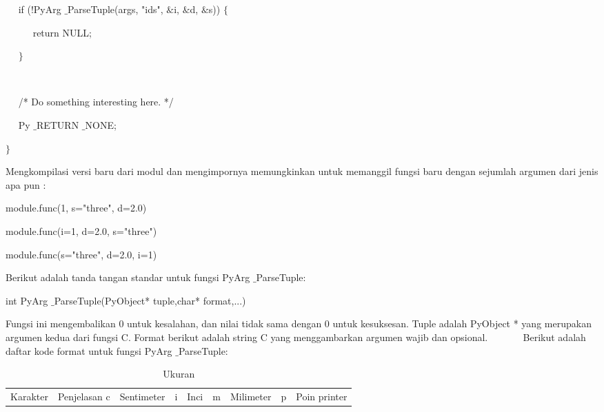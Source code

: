 \noindent 
~~ if (!PyArg $  \_  $ParseTuple(args, "ids",  $  \&  $i,  $  \&  $d,  $  \&  $s))  $  \{  $ \par
\noindent 
~~~~~ return NULL; \par
\noindent 
~~  $  \}  $ \par
\noindent 
~~  \par
\noindent 
~~ /* Do something interesting here. */ \par
\noindent 
~~ Py $  \_  $RETURN $  \_  $NONE; \par
\noindent 
 $  \}  $ \par
\vspace{12pt}
Mengkompilasi versi baru dari modul dan mengimpornya memungkinkan untuk memanggil fungsi baru dengan sejumlah argumen dari jenis apa pun : \par
\noindent 
module.func(1, s="three", d=2.0) \par
\noindent 
module.func(i=1, d=2.0, s="three") \par
\noindent 
module.func(s="three", d=2.0, i=1) \par
\vspace{12pt}
\vspace{12pt}
\vspace{12pt}
\vspace{12pt}
\noindent 
 \hspace*{0.5in} Berikut adalah tanda tangan standar untuk fungsi PyArg $  \_  $ParseTuple: \par
\noindent 
int PyArg $  \_  $ParseTuple(PyObject* tuple,char* format,...) \par
\vspace{12pt}
\noindent 
 \hspace*{0.5in} Fungsi ini mengembalikan 0 untuk kesalahan, dan nilai tidak sama dengan 0 untuk kesuksesan. Tuple adalah PyObject * yang merupakan argumen kedua dari fungsi C. Format berikut adalah string C yang menggambarkan argumen wajib dan opsional.\vspace{\baselineskip}
~~~~~~ Berikut adalah daftar kode format untuk fungsi PyArg $  \_  $ParseTuple: \par




\begin{table}[ht]
	\caption{Ukuran}
	\begin{tabular*}{\textwidth}{@{\extracolsep{\fill}}lcc}
		\hline
		Karakter&  Penjelasan \cr
		\hline
		c&Sentimeter&\cr
		i&Inci&\cr
		m&Milimeter&\cr
		p&Poin printer\cr
		\hline
	\end{tabular*}
	\begin{tablenotes}
	\end{tablenotes}
\end{table}

